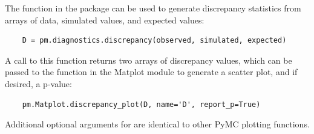 The  function in the  package can be used to generate discrepancy statistics from arrays of data, simulated values, and expected values:

\begin{verbatim}
	D = pm.diagnostics.discrepancy(observed, simulated, expected)
\end{verbatim}

A call to this function returns two arrays of discrepancy values, which can be passed to the  function in the Matplot module to generate a scatter plot, and if desired, a p-value:

\begin{verbatim}
	pm.Matplot.discrepancy_plot(D, name='D', report_p=True)
\end{verbatim}

Additional optional arguments for  are identical to other PyMC plotting functions.

